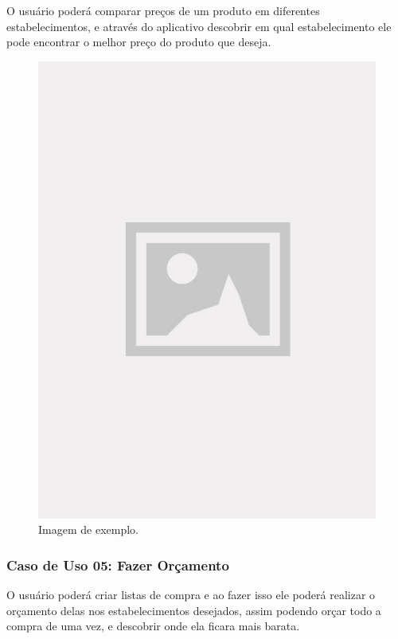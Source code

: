 O usuário poderá comparar preços de um produto em diferentes estabelecimentos, e através do aplicativo descobrir em qual estabelecimento ele pode encontrar o melhor preço do produto que deseja.

\begin{figure}[!htb]
\centering
\caption{Imagem de exemplo.}
\includegraphics[width=\linewidth]{figuras/placeholder.jpg}
\end{figure}

\subsubsection{Caso de Uso 05: Fazer Orçamento}

O usuário poderá criar listas de compra e ao fazer isso ele poderá realizar o orçamento delas nos estabelecimentos desejados, assim podendo orçar todo a compra de uma vez, e descobrir onde ela ficara mais barata.

